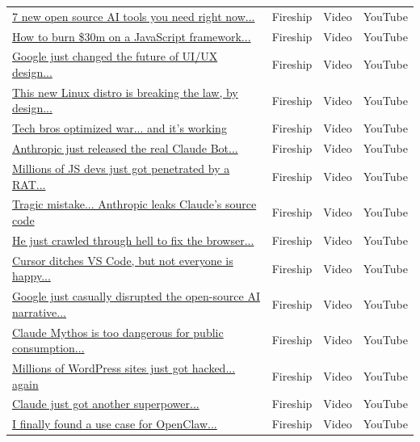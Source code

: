 \documentclass[12pt]{article}
\begin{document}
\begin{longtable}{p{} p{} p{} p{}}
            \href{https://www.youtube.com/watch?v=Xn-gtHDsaPY}{7 new open source AI tools you need right now...} & Fireship & Video & YouTube \\[2pt]
            \href{https://www.youtube.com/watch?v=ReAnFFqvCeA}{How to burn \$30m on a JavaScript framework...} & Fireship & Video & YouTube \\[2pt]
            \href{https://www.youtube.com/watch?v=qaB5HF4ax9M}{Google just changed the future of UI/UX design...} & Fireship & Video & YouTube \\[2pt]
            \href{https://www.youtube.com/watch?v=nkY_s9HpL9M}{This new Linux distro is breaking the law, by design...} & Fireship & Video & YouTube \\[2pt]
            \href{https://www.youtube.com/watch?v=nxwkn9Dt9-I}{Tech bros optimized war... and it's working} & Fireship & Video & YouTube \\[2pt]
            \href{https://www.youtube.com/watch?v=wfeiCZK0mNs}{Anthropic just released the real Claude Bot...} & Fireship & Video & YouTube \\[2pt]
            \href{https://www.youtube.com/watch?v=o7NYXvYohYk}{Millions of JS devs just got penetrated by a RAT...} & Fireship & Video & YouTube \\[2pt]
            \href{https://www.youtube.com/watch?v=mBHRPeg8zPU}{Tragic mistake... Anthropic leaks Claude's source code} & Fireship & Video & YouTube \\[2pt]
            \href{https://www.youtube.com/watch?v=vd14EElCRvs}{He just crawled through hell to fix the browser...} & Fireship & Video & YouTube \\[2pt]
            \href{https://www.youtube.com/watch?v=JSuS-zXMVwE}{Cursor ditches VS Code, but not everyone is happy...} & Fireship & Video & YouTube \\[2pt]
            \href{https://www.youtube.com/watch?v=-01ZCTt-CJw}{Google just casually disrupted the open-source AI narrative...} & Fireship & Video & YouTube \\[2pt]
            \href{https://www.youtube.com/watch?v=d3Qq-rkp_to}{Claude Mythos is too dangerous for public consumption...} & Fireship & Video & YouTube \\[2pt]
            \href{https://www.youtube.com/watch?v=piah4fV_o2Q}{Millions of WordPress sites just got hacked... again} & Fireship & Video & YouTube \\[2pt]
            \href{https://www.youtube.com/watch?v=jeA-KBv0b68}{Claude just got another superpower...} & Fireship & Video & YouTube \\[2pt]
            \href{https://www.youtube.com/watch?v=FM5-R4VPArw}{I finally found a use case for OpenClaw...} & Fireship & Video & YouTube \\[2pt]
            \end{longtable}
\end{document}
